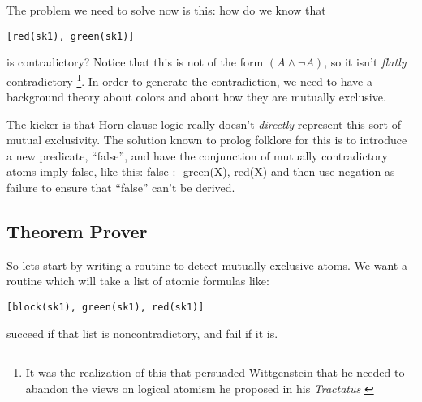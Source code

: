 \documentclass{book}[9pt]
\newenvironment{code}%
{\small \verbatim}%
{\endverbatim \large}
\begin{document}
The problem we need to solve now is this: how do we know that
\begin{verbatim}
[red(sk1), green(sk1)]
\end{verbatim}
\noindent is contradictory?  Notice that this is not of the
form $(A \wedge \neg A)$, so it isn't {\em flatly} contradictory
\footnote{It was the realization of this that persuaded Wittgenstein that 
he needed to abandon the views on logical atomism he proposed in
his {\em Tractatus} \cite{monk}}.
In order to generate the contradiction, we need to have a background
theory about colors and about how they are mutually exclusive.

The kicker is that Horn clause logic really doesn't {\em directly} represent
this sort of mutual exclusivity.  The solution known to prolog folklore for
this is to introduce a new predicate, ``false'', and have the conjunction of
mutually contradictory atoms imply false, like this:
\begin{code}
false :- green(X), red(X)
\end{code}
\noindent and then use negation as failure to ensure
that ``false'' can't be derived.

\subsection{Theorem Prover}

So lets start by writing a routine to detect mutually exclusive atoms.
We want a routine which will take a list of atomic formulas like:
\begin{verbatim}
[block(sk1), green(sk1), red(sk1)]
\end{verbatim}
\noindent succeed if that list is noncontradictory, and fail if it is.
\end{document}

